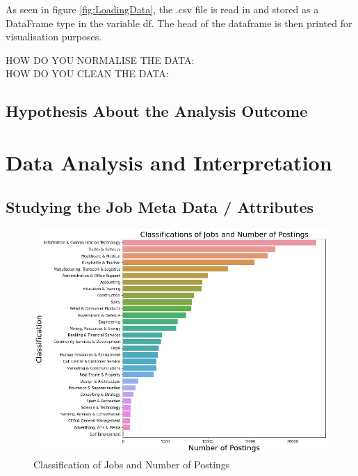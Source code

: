\documentclass[twoside, 12pt, a4paper]{article}
\begin{document}
As seen in figure \ref{fig:LoadingData}, the .csv file is read in and stored as a DataFrame type in the variable df. The head of the dataframe is then printed for visualisation purposes. 

HOW DO YOU NORMALISE THE DATA:\\
HOW DO YOU CLEAN THE DATA:

\subsection{Hypothesis About the Analysis Outcome}

\newpage 
\section{Data Analysis and Interpretation}
\subsection{Studying the Job Meta Data / Attributes}

\begin{figure}[h]
	\centering
	\includegraphics[scale = 0.45]{ClassVsPostings.png}
	\caption{Classification of Jobs and Number of Postings}
	\label{fig:ClassVsPosts}
\end{figure}
\end{document}

